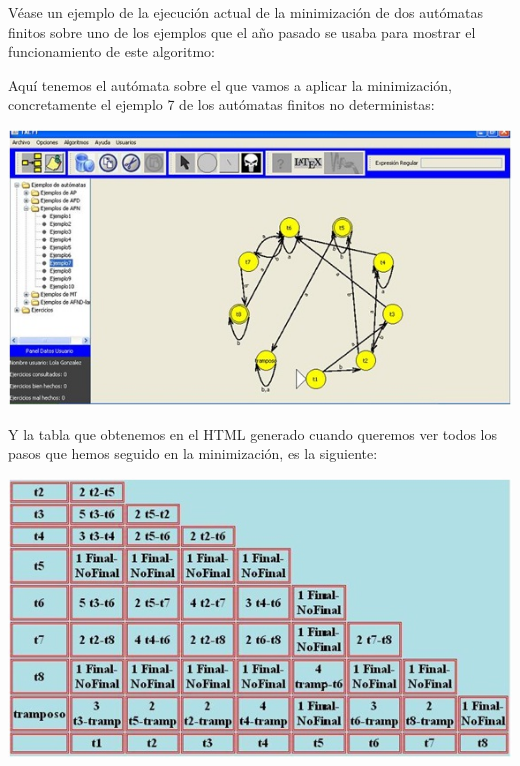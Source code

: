 \documentclass[12pt,a4paper,spanish]{book}
\begin{document}
V\'ease un ejemplo de la ejecuci\'on actual de la minimizaci\'on de dos aut\'omatas finitos sobre uno de los ejemplos que el a\~no pasado se usaba para mostrar el funcionamiento de este algoritmo:

Aqu\'i tenemos el aut\'omata sobre el que vamos a aplicar la minimizaci\'on, concretamente el ejemplo 7 de los aut\'omatas finitos no deterministas:\\
\begin{center}
\includegraphics[width=\textwidth]{auto1.jpg}\newline \newline 

\end{center}


Y la tabla que obtenemos en el HTML generado cuando queremos ver todos los pasos que hemos seguido en la minimizaci\'on, es la siguiente:
\newline 
\begin{center}
\includegraphics[width=\textwidth]{tabla1.jpg}\\
\end{center}
\end{document}
